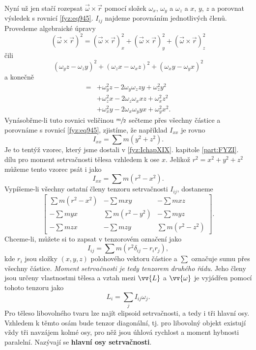     Nyní už jen stačí rozepsat \(\vec{ω}\times\vec{r}\) pomocí složek \(ω_x\), \(ω_y\) a \(ω_z\) a
    \(x\), \(y\), \(z\) a porovnat výsledek s rovnicí \eqref{fyz:eq945}. \(I_{ij}\) najdeme
    porovnáním jednotlivých členů. Provedeme algebraické úpravy
    \begin{equation*}
      (\vec{ω}×\vec{r})^2=(\vec{ω}×\vec{r})^2_x+(\vec{ω}×\vec{r})^2_y+(\vec{ω}×\vec{r})^2_z
    \end{equation*}
    čili
    \begin{equation*}
      (ω_yz−ω_zy)^2+(ω_zx−ω_xz)^2+(ω_xy−ω_yx)^2
    \end{equation*}
    a konečně
    \begin{align*}
      = &+ω_y^2z − 2ω_yω_z zy + ω_z^2y^2 \\
        &+ω_z^2x − 2ω_zω_x xz + ω_x^2z^2 \\
        &+ω_x^2y − 2ω_xω_y yx + ω_y^2x^2.
    \end{align*}
    Vynásobřme-li tuto rovnici veličinou \(\sfrac{m}{2}\) sečteme přes všechny částice a porovnáme s
    rovnicí \eqref{fyz:eq945}, zjistíme, že například \(I_{xx}\) je rovno
    \begin{equation*}
      I_{xx}=∑m(y^2+z^2).
    \end{equation*}
    Je to tentýž vzorec, který jsme dostali v \ref{fyz:IchapXIX}. kapitole \ref{part:FYZI}. dílu pro
    moment setrvačnosti tělesa vzhledem k ose \(x\). Jelikož \(r^2 = x^2 + y^2 + z^2\) můžeme tento
    vzorec psát i jako
    \begin{equation*}
      I_{xx}=∑m(r^2-x^2).
    \end{equation*}
    Vypíšeme-li všechny ostatní členy tenzoru setrvačnosti \(I_{ij}\), dostaneme
    \begin{equation*}
      \begin{bmatrix}
        \sum m(r^2-x^2) &    -\sum mxy     &   -\sum mxz     \\
          -\sum myx     &  \sum m(r^2-y^2) &   -\sum myz     \\
          -\sum mzx     &    -\sum mzy     & \sum m(r^2-z^2)
      \end{bmatrix}.
    \end{equation*}
    Chceme-li, můžete si to zapsat v tenzorovém označení jako
    \begin{equation}\label{fyz:eq949}
      I_{ij}=\sum m(r^2\delta_{ij}-r_ir_j),
    \end{equation}
    kde \(r_i\) jsou složky \((x, y, z)\) polohového vektoru částice a \(\sum\) označuje sumu přes
    všechny částice. \emph{Moment setrvačnosti je tedy tenzorem druhého řádu}. Jeho členy jsou
    určeny vlastnostmi tělesa a vztah mezi \(\vv{L}\) a \(\vv{\omega}\) je vyjádřen pomocí tohoto
    tenzoru jako
    \begin{equation}\label{fyz:eq950}
      L_i=\sum_jI_{ij}\omega_j.
    \end{equation}
    Pro těleso libovolného tvaru lze najít elipsoid setrvačnosti, a tedy i tři hlavní osy. Vzhledem
    k těmto osám bude tenzor diagonální, tj. pro libovolný objekt existují vždy tři navzájem kolmé
    osy, pro něž jsou úhlová rychlost a moment hybnosti paralelní. Nazývají se \textbf{hlavní osy
    setrvačnosti}.

